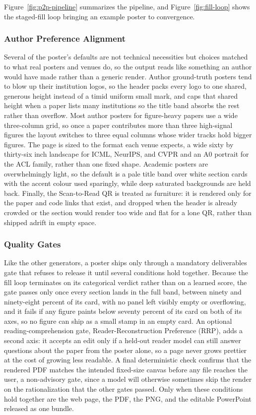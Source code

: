 \documentclass{article}
\begin{document}
Figure~\ref{fig:p2p-pipeline} summarizes the pipeline, and Figure~\ref{fig:fill-loop} shows the staged-fill loop bringing an example poster to convergence.

\subsubsection{Author Preference Alignment}

Several of the poster's defaults are not technical necessities but choices matched to what real posters and venues do, so the output reads like something an author would have made rather than a generic render. Author ground-truth posters tend to blow up their institution logos, so the header packs every logo to one shared, generous height instead of a timid uniform small mark, and caps that shared height when a paper lists many institutions so the title band absorbs the rest rather than overflow. Most author posters for figure-heavy papers use a wide three-column grid, so once a paper contributes more than three high-signal figures the layout switches to three equal columns whose wider tracks hold bigger figures. The page is sized to the format each venue expects, a wide sixty by thirty-six inch landscape for ICML, NeurIPS, and CVPR and an A0 portrait for the ACL family, rather than one fixed shape. Academic posters are overwhelmingly light, so the default is a pale title band over white section cards with the accent colour used sparingly, while deep saturated backgrounds are held back. Finally, the Scan-to-Read QR is treated as furniture: it is rendered only for the paper and code links that exist, and dropped when the header is already crowded or the section would render too wide and flat for a lone QR, rather than shipped adrift in empty space.

\subsubsection{Quality Gates}

Like the other generators, a poster ships only through a mandatory deliverables gate that refuses to release it until several conditions hold together. Because the fill loop terminates on its categorical verdict rather than on a learned score, the gate passes only once every section lands in the full band, between ninety and ninety-eight percent of its card, with no panel left visibly empty or overflowing, and it fails if any figure paints below seventy percent of its card on both of its axes, so no figure can ship as a small stamp in an empty card. An optional reading-comprehension gate, Reader-Reconstruction Preference (RRP), adds a second axis: it accepts an edit only if a held-out reader model can still answer questions about the paper from the poster alone, so a page never grows prettier at the cost of growing less readable. A final deterministic check confirms that the rendered PDF matches the intended fixed-size canvas before any file reaches the user, a non-advisory gate, since a model will otherwise sometimes skip the render on the rationalization that the other gates passed. Only when these conditions hold together are the web page, the PDF, the PNG, and the editable PowerPoint released as one bundle.
\end{document}
